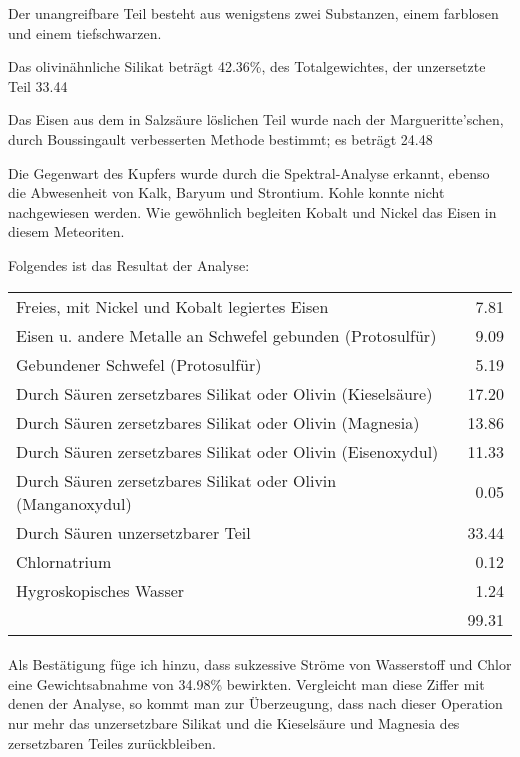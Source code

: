 \documentclass[a4paper, 11pt, oneside]{article}
\begin{document}
Der unangreifbare Teil besteht aus wenigstens zwei Substanzen, einem farblosen und einem tiefschwarzen.

Das olivinähnliche Silikat beträgt 42.36\%, des Totalgewichtes, der unzersetzte Teil 33.44%

Das Eisen aus dem in Salzsäure löslichen Teil wurde nach der Margueritte'schen, durch Boussingault verbesserten Methode bestimmt; es beträgt 24.48%

Die Gegenwart des Kupfers wurde durch die Spektral-Analyse erkannt, ebenso die Abwesenheit von Kalk, Baryum und Strontium. Kohle konnte nicht nachgewiesen werden. Wie gewöhnlich begleiten Kobalt und Nickel das Eisen in diesem Meteoriten.

Folgendes ist das Resultat der Analyse:
\normalsize
\begin{center}
\begin{tabular}{ l r }
    Freies, mit Nickel und Kobalt legiertes Eisen & 7.81\\
    Eisen u. andere Metalle an Schwefel gebunden (Protosulfür) & 9.09\\
    Gebundener Schwefel (Protosulfür) & 5.19\\
    Durch Säuren zersetzbares Silikat oder Olivin (Kieselsäure) & 17.20\\
    Durch Säuren zersetzbares Silikat oder Olivin (Magnesia) & 13.86\\
    Durch Säuren zersetzbares Silikat oder Olivin (Eisenoxydul) & 11.33\\
    Durch Säuren zersetzbares Silikat oder Olivin (Manganoxydul) & 0.05\\
    Durch Säuren unzersetzbarer Teil & 33.44\\
    Chlornatrium & 0.12\\
    Hygroskopisches Wasser & 1.24\\
     & 99.31\\
\end{tabular}
\end{center}
\LARGE
\paragraph{}
Als Bestätigung füge ich hinzu, dass sukzessive Ströme von Wasserstoff und Chlor eine Gewichtsabnahme von 34.98\% bewirkten. Vergleicht man diese Ziffer mit denen der Analyse, so kommt man zur Überzeugung, dass nach dieser Operation nur mehr das unzersetzbare Silikat und die Kieselsäure und Magnesia des zersetzbaren Teiles zurückbleiben.
\end{document}
